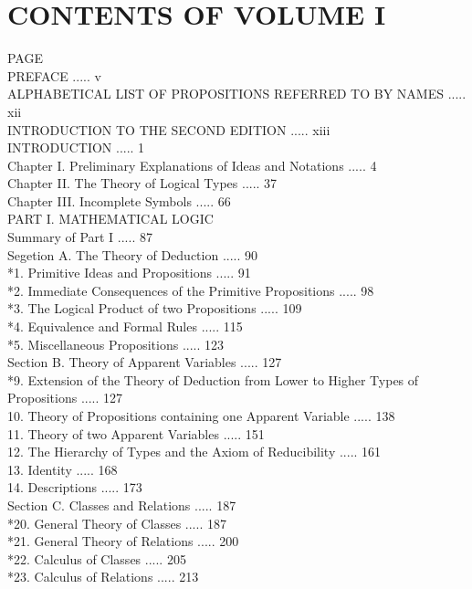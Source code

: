 \documentclass[10pt]{article}
\begin{document}
\section*{CONTENTS OF VOLUME I}
PAGE\\
PREFACE ..... v\\
ALPHABETICAL LIST OF PROPOSITIONS REFERRED TO BY NAMES ..... xii\\
INTRODUCTION TO THE SECOND EDITION ..... xiii\\
INTRODUCTION ..... 1\\
Chapter I. Preliminary Explanations of Ideas and Notations ..... 4\\
Chapter II. The Theory of Logical Types ..... 37\\
Chapter III. Incomplete Symbols ..... 66\\
PART I. MATHEMATICAL LOGIC\\
Summary of Part I ..... 87\\
Segetion A. The Theory of Deduction ..... 90\\
*1. Primitive Ideas and Propositions ..... 91\\
*2. Immediate Consequences of the Primitive Propositions ..... 98\\
*3. The Logical Product of two Propositions ..... 109\\
*4. Equivalence and Formal Rules ..... 115\\
*5. Miscellaneous Propositions ..... 123\\
Section B. Theory of Apparent Variables ..... 127\\
*9. Extension of the Theory of Deduction from Lower to Higher Types of Propositions ..... 127\\
10. Theory of Propositions containing one Apparent Variable ..... 138\\
11. Theory of two Apparent Variables ..... 151\\
12. The Hierarchy of Types and the Axiom of Reducibility ..... 161\\
13. Identity ..... 168\\
14. Descriptions ..... 173\\
Section C. Classes and Relations ..... 187\\
*20. General Theory of Classes ..... 187\\
*21. General Theory of Relations ..... 200\\
*22. Calculus of Classes ..... 205\\
*23. Calculus of Relations ..... 213\\
\end{document}
